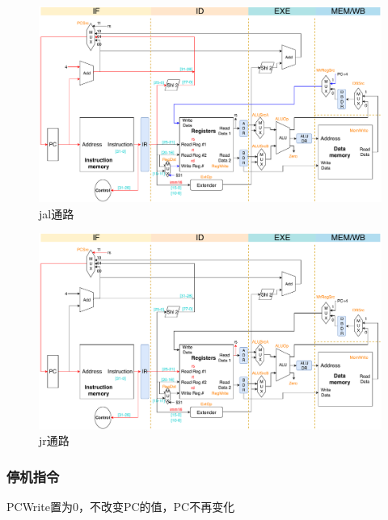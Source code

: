 \begin{figure}[H]
\centering
\includegraphics[width=\linewidth]{fig/Datapath-jal.pdf}
\caption{jal通路}
\label{fig:datapath_jal}
\end{figure}
\begin{figure}[H]
\centering
\includegraphics[width=\linewidth]{fig/Datapath-jr.pdf}
\caption{jr通路}
\label{fig:datapath_jr}
\end{figure}

\subsubsection{停机指令}
\qquad PCWrite置为0，不改变PC的值，PC不再变化